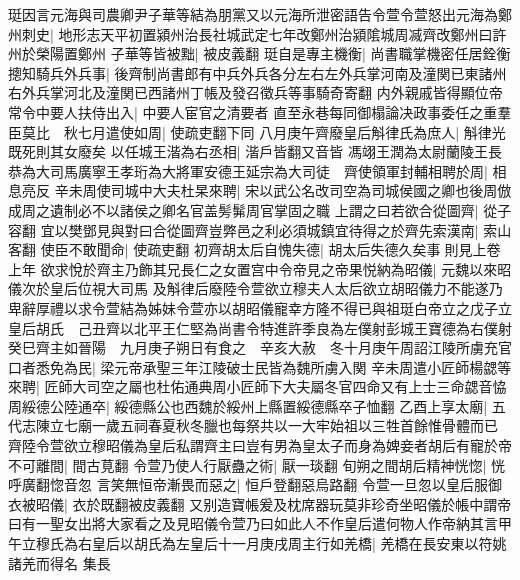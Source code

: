 珽因言元海與司農卿尹子華等結為朋黨又以元海所泄密語告令萱令萱怒出元海為鄭州刺史|{
	地形志天平初置潁州治長社城武定七年改鄭州治潁隂城周㓕齊改鄭州曰許州於榮陽置鄭州}
子華等皆被黜|{
	被皮義翻}
珽自是專主機衡|{
	尚書職掌機密任居銓衡}
摠知騎兵外兵事|{
	後齊制尚書郎有中兵外兵各分左右左外兵掌河南及潼関已東諸州右外兵掌河北及潼関已西諸州丁帳及發召徵兵等事騎奇寄翻}
内外親戚皆得顯位帝常令中要人扶侍出入|{
	中要人宦官之清要者}
直至永巷每同御榻論决政事委任之重羣臣莫比　秋七月遣使如周|{
	使疏吏翻下同}
八月庚午齊廢皇后斛律氏為庶人|{
	斛律光既死則其女廢矣}
以任城王湝為右丞相|{
	湝戶皆翻又音皆}
馮翊王潤為太尉蘭陵王長恭為大司馬廣寧王孝珩為大將軍安德王延宗為大司徒　齊使領軍封輔相聘於周|{
	相息亮反}
辛未周使司城中大夫杜杲來聘|{
	宋以武公名改司空為司城侯國之卿也後周倣成周之遺制必不以諸侯之卿名官盖髣髴周官掌固之職}
上謂之曰若欲合從圖齊|{
	從子容翻}
宜以樊鄧見與對曰合從圖齊豈弊邑之利必須城鎮宜待得之於齊先索漢南|{
	索山客翻}
使臣不敢聞命|{
	使疏吏翻}
初齊胡太后自愧失德|{
	胡太后失德久矣事則見上卷上年}
欲求悅於齊主乃飾其兄長仁之女置宫中令帝見之帝果悦納為昭儀|{
	元魏以來昭儀次於皇后位視大司馬}
及斛律后廢陸令萱欲立穆夫人太后欲立胡昭儀力不能遂乃卑辭厚禮以求令萱結為姊妹令萱亦以胡昭儀寵幸方隆不得已與祖珽白帝立之戊子立皇后胡氏　己丑齊以北平王仁堅為尚書令特進許季良為左僕射彭城王寶德為右僕射　癸巳齊主如晉陽　九月庚子朔日有食之　辛亥大赦　冬十月庚午周詔江陵所虜充官口者悉免為民|{
	梁元帝承聖三年江陵破士民皆為魏所虜入関}
辛未周遣小匠師楊勰等來聘|{
	匠師大司空之屬也杜佑通典周小匠師下大夫屬冬官四命又有上士三命勰音恊}
周綏德公陸通卒|{
	綏德縣公也西魏於綏州上縣置綏德縣卒子恤翻}
乙酉上享太廟|{
	五代志陳立七廟一歲五祠春夏秋冬臘也每祭共以一大牢始祖以三牲首餘惟骨體而已}
齊陸令萱欲立穆昭儀為皇后私謂齊主曰豈有男為皇太子而身為婢妾者胡后有寵於帝不可離間|{
	間古莧翻}
令萱乃使人行厭蠱之術|{
	厭一琰翻}
旬朔之間胡后精神恍惚|{
	恍呼廣翻惚音忽}
言笑無恒帝漸畏而惡之|{
	恒戶登翻惡烏路翻}
令萱一旦忽以皇后服御衣被昭儀|{
	衣於既翻被皮義翻}
又别造寶帳爰及枕席器玩莫非珍奇坐昭儀於帳中謂帝曰有一聖女出將大家看之及見昭儀令萱乃曰如此人不作皇后遣何物人作帝納其言甲午立穆氏為右皇后以胡氏為左皇后十一月庚戌周主行如羌橋|{
	羌橋在長安東以符姚諸羌而得名}
集長

